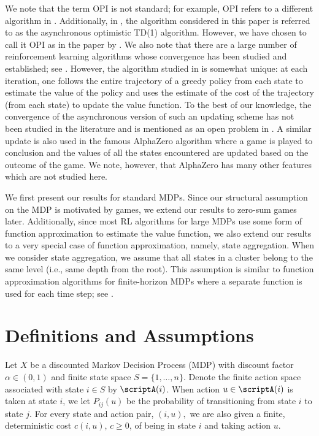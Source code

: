 \documentclass[12pt]{article}
\begin{document}
We note that the term OPI is not standard; for example, OPI refers to a different algorithm in \cite{bertsekasvolI,bersekasvolII}. Additionally, in \cite[Section 5.4]{bertsekastsitsiklis}, the algorithm considered in this paper is referred to as the asynchronous optimistic TD(1) algorithm. However, we have chosen to call it OPI as in the paper by \cite{tsitsiklis2002convergence}.  We also note that there are a large number of reinforcement learning algorithms whose convergence has been studied and established; see \cite{bertsekas2019reinforcement}. However, the algorithm studied in \cite{tsitsiklis2002convergence} is somewhat unique: at each iteration, one follows the entire trajectory of a greedy policy from each state to estimate the value of the policy and uses the estimate of the cost of the trajectory (from each state) to update the value function. To the best of our knowledge, the convergence of the asynchronous version of such an updating scheme has not been studied in the literature and is mentioned as an open problem in \cite{tsitsiklis2002convergence}. A similar update is also used in the famous AlphaZero algorithm \cite{silver2017mastering} where a game is played to conclusion and the values of all the states encountered are updated based on the outcome of the game. We note, however, that AlphaZero has many other features which are not studied here.

We first present our results for standard MDPs. Since our structural assumption on the MDP is motivated by games, we extend our results to zero-sum games later.  Additionally, since most RL algorithms for large MDPs use some form of function approximation to estimate the value function, we also extend our results to a very special case of function approximation, namely, state aggregation. When we consider state aggregation, we assume that all states in a cluster belong to the same level (i.e., same depth from the root). This assumption is similar to function approximation algorithms for finite-horizon MDPs where a separate function is used for each time step; see \cite{Jordan, jin2020provably}.

\section{Definitions and Assumptions}

Let $X$ be a discounted Markov Decision Process (MDP) with discount factor $\alpha \in (0, 1)$ and finite state space $S = \{1, \ldots, n\}$. Denote the finite action space associated with state $i \in S$ by $\scriptA(i)$. When action $u \in \scriptA(i)$ is taken at state $i$, we let $P_{ij}(u)$ be the probability of transitioning from state $i$ to state $j$. For every state and action pair, $(i, u),$ we are also given a finite, deterministic cost $c(i, u)$, $c \geq 0$, of being in state $i$ and taking action $u$.
\end{document}
